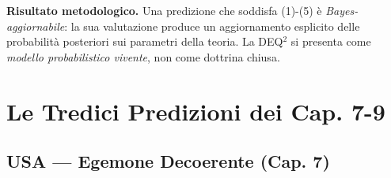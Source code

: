 \Proved{} \textbf{Risultato metodologico.} Una predizione che soddisfa
(1)-(5) è \emph{Bayes-aggiornabile}: la sua valutazione produce un
aggiornamento esplicito delle probabilità posteriori sui parametri della
teoria. La DEQ$^2$ si presenta come \emph{modello probabilistico vivente},
non come dottrina chiusa.



\section{Le Tredici Predizioni dei Cap.
7-9}\label{le-tredici-predizioni-dei-cap.-7-9}

\subsection{USA --- Egemone Decoerente (Cap.
7)}\label{usa-egemone-decoerente-cap.-7}

